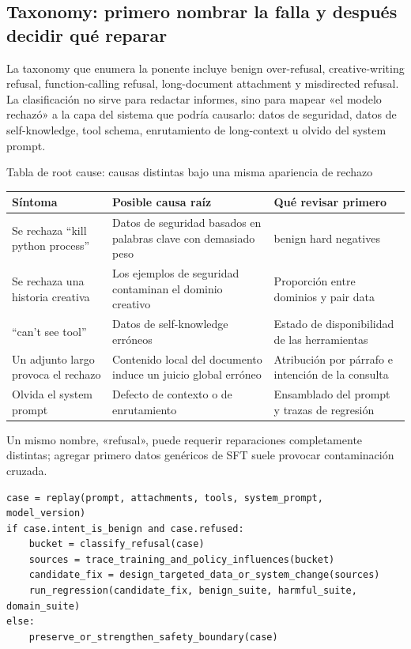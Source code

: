 \subsection{Taxonomy: primero nombrar la falla y después decidir qué reparar}

La taxonomy que enumera la ponente incluye benign over-refusal, creative-writing refusal, function-calling refusal, long-document attachment y misdirected refusal. La clasificación no sirve para redactar informes, sino para mapear «el modelo rechazó» a la capa del sistema que podría causarlo: datos de seguridad, datos de self-knowledge, tool schema, enrutamiento de long-context u olvido del system prompt.



\begin{knowledgebox}{Tabla de root cause: causas distintas bajo una misma apariencia de rechazo}
\begin{tabularx}{\textwidth}{L{0.22\textwidth} X X}
\toprule
Síntoma & Posible causa raíz & Qué revisar primero \\
\midrule
Se rechaza ``kill python process'' & Datos de seguridad basados en palabras clave con demasiado peso & benign hard negatives \\
Se rechaza una historia creativa & Los ejemplos de seguridad contaminan el dominio creativo & Proporción entre dominios y pair data \\
``can't see tool'' & Datos de self-knowledge erróneos & Estado de disponibilidad de las herramientas \\
Un adjunto largo provoca el rechazo & Contenido local del documento induce un juicio global erróneo & Atribución por párrafo e intención de la consulta \\
Olvida el system prompt & Defecto de contexto o de enrutamiento & Ensamblado del prompt y trazas de regresión \\
\bottomrule
\end{tabularx}
Un mismo nombre, «refusal», puede requerir reparaciones completamente distintas; agregar primero datos genéricos de SFT suele provocar contaminación cruzada.
\end{knowledgebox}

\begin{lstlisting}[caption={Flujo mínimo de triaje para fallas de rechazo}]
case = replay(prompt, attachments, tools, system_prompt, model_version)
if case.intent_is_benign and case.refused:
    bucket = classify_refusal(case)
    sources = trace_training_and_policy_influences(bucket)
    candidate_fix = design_targeted_data_or_system_change(sources)
    run_regression(candidate_fix, benign_suite, harmful_suite, domain_suite)
else:
    preserve_or_strengthen_safety_boundary(case)
\end{lstlisting}

